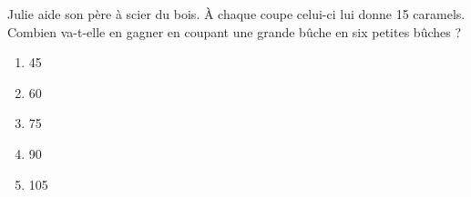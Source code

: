  Julie aide son père à scier du bois. \`A chaque coupe celui-ci lui
donne 15 caramels.  Combien va-t-elle en gagner en coupant une grande
bûche en six petites bûches ?
\begin{multicols}{5}
  \begin{enumerate}[A/]
  \item 45
  \item 60
  \item 75
  \item 90
  \item 105
  \end{enumerate}
\end{multicols}